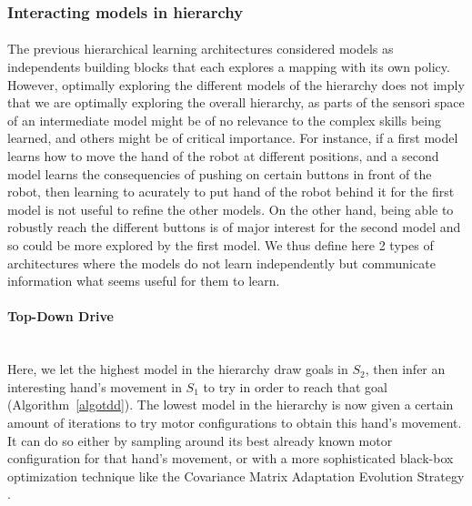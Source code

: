 \documentclass[12pt]{article}
\begin{document}
			
		\subsubsection{Interacting models in hierarchy}
		\label{sec:interacting}
			\paragraph{}
			The previous hierarchical learning architectures considered models as independents building blocks that each explores a mapping with
			its own policy. 
			However, optimally exploring the different models of the hierarchy does not imply that we are optimally exploring the overall hierarchy, 
			as parts of the sensori space of an intermediate model might be of no relevance to the complex skills being learned, and others might be
			of critical importance. 
			For instance, if a first model learns how to move the hand of the robot at different positions, and a second model 
			learns the consequencies of pushing on certain buttons in front of the robot, then learning to acurately to put hand of the robot behind 
			it for the first model is not useful to refine the other models. On the other hand, being able to robustly reach the different buttons is of 
			major interest for the second model and so could be more explored by the first model.
			We thus define here 2 types of architectures where the models do not learn independently but communicate information what seems 
			useful for them to learn.
			
			\paragraph{Top-Down Drive}~\\
			
			Here, we let the highest model in the hierarchy draw goals in $S_2$, then infer an interesting hand's movement 
			in $S_1$ to try in order to reach that goal (Algorithm~\ref{algotdd}).
			The lowest model in the hierarchy is now given a certain amount of iterations to try motor configurations to obtain this hand's movement. 
			It can do so either by sampling around its best already known motor configuration for that hand's movement, 
			or with a more sophisticated black-box optimization technique like the Covariance Matrix Adaptation Evolution Strategy \cite{cma}. 			
			
\end{document}
